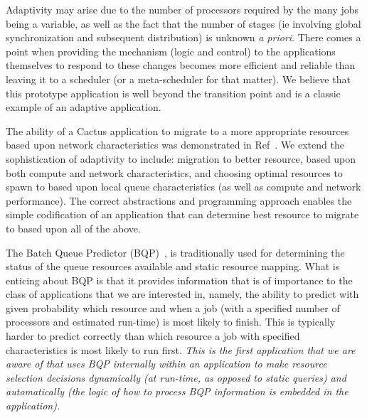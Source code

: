 \documentclass[conference,final]{IEEEtran}
\begin{document}
Adaptivity may arise due to the number of processors required by the
many jobs being a variable, as well as the fact that the number of
stages (ie involving global synchronization and subsequent
distribution) is unknown {\it a priori}. There comes a point when
providing the mechanism (logic and control) to the applications
themselves to respond to these changes becomes more efficient and
reliable than leaving it to a scheduler (or a meta-scheduler for that
matter). We believe that this prototype application is well beyond the
transition point and is a classic example of an adaptive application.

The ability of a Cactus application to migrate to a more appropriate
resources based upon network characteristics was demonstrated in
Ref~\cite{escience07}.  We extend the sophistication of adaptivity to
include: migration to better resource, based upon both compute and
network characteristics, and choosing optimal resources to spawn to
based upon local queue characteristics (as well as compute and network
performance). The correct abstractions and programming approach
enables the simple codification of an application that can determine
best resource to migrate to based upon all of the above.

 The Batch
Queue Predictor (BQP)~\cite{bqp, bqp_url}, is traditionally used for
determining the status of the queue resources available and static
resource mapping. What is enticing about BQP is that it provides
information that is of importance to the class of applications that we
are interested in, namely, the ability to predict with given
probability which resource and when a job (with a specified number of
processors and estimated run-time) is most likely to finish.  This is
typically harder to predict correctly than which resource a job with
specified characteristics is most likely to run first.  {\it This is
  the first application that we are aware of that uses BQP internally
  within an application to make resource selection decisions
  dynamically (at run-time, as opposed to static queries) and
  automatically (the logic of how to process BQP information is
  embedded in the application).}
\end{document}
